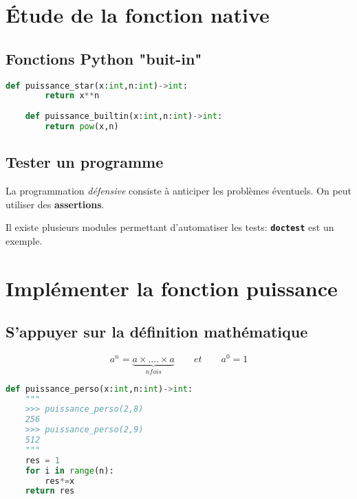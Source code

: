 \documentclass[a4paper,11pt]{article}
\begin{document}
\begin{center}
\end{center}
\section{Étude de la fonction native}
\subsection{Fonctions Python "buit-in"}
\begin{center}
    \begin{lstlisting}[language=Python , basicstyle=\ttfamily, xleftmargin=2em, xrightmargin=2em]
    def puissance_star(x:int,n:int)->int:
        return x**n
    
    def puissance_builtin(x:int,n:int)->int:
        return pow(x,n)
    \end{lstlisting}
    \label{builtin}
    \end{center}
\subsection{Tester un programme}
\begin{aretenir}[]
    La programmation \emph{défensive} consiste à anticiper les problèmes éventuels. On peut utiliser des \textbf{assertions}.
\end{aretenir}
Il existe plusieurs modules permettant d'automatiser les tests: \textbf{\texttt{doctest}} est un exemple.
\section{Implémenter la fonction puissance}
\subsection{S'appuyer sur la définition mathématique}
$$a^n=\underbrace{a ×....× a}_{n fois}\qquad et \qquad a^0=1$$
\begin{center}
    \begin{lstlisting}[language=Python , basicstyle=\ttfamily, xleftmargin=2em, xrightmargin=2em]
def puissance_perso(x:int,n:int)->int:
    """
    >>> puissance_perso(2,8)
    256
    >>> puissance_perso(2,9)
    512
    """
    res = 1
    for i in range(n):
        res*=x
    return res
\end{lstlisting}
    \end{center}
\end{document}
